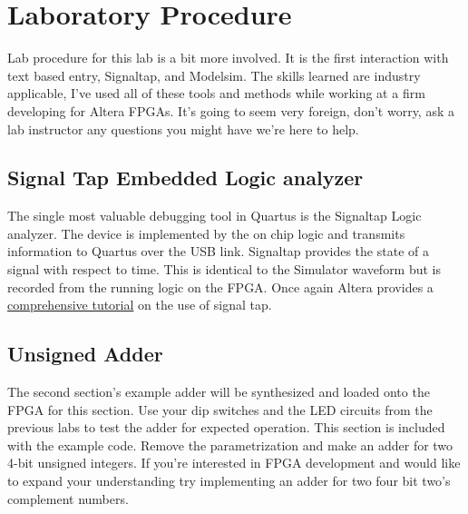   \section{Laboratory Procedure}
     Lab procedure for this lab is a bit more involved. It is the first interaction with text based entry, Signaltap, and Modelsim. The skills learned are industry applicable, I've used all of these tools and methods while working at a firm developing for Altera FPGAs. It's going to seem very foreign, don't worry, ask a lab instructor any questions you might have we're here to help.

  \subsection{Signal Tap Embedded Logic analyzer}
    The single most valuable debugging tool in Quartus is the Signaltap Logic analyzer. The device is implemented by the on chip logic and transmits information to Quartus over the USB link.  Signaltap provides the state of a signal with respect to time. This is identical to the Simulator waveform but is recorded from the running logic on the FPGA. Once again Altera provides a \href{ftp://ftp.altera.com/up/pub/Altera_Material/13.0/Tutorials/Verilog/SignalTap.pdf}{comprehensive tutorial} on the use of signal tap.

  \subsection{Unsigned Adder}
    The second section's example adder will be synthesized and loaded onto the FPGA for this section. Use your dip switches and the LED circuits from the previous labs to test the adder for expected operation. This section is included with the example code. Remove the parametrization and make an adder for two 4-bit unsigned integers. If you're interested in FPGA development and would like to expand your understanding try implementing an adder for two four bit two's complement numbers. 

